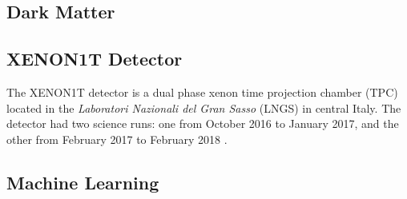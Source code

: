 \subsection{Dark Matter}
\subsection{XENON1T Detector}
The XENON1T detector is a dual phase xenon time projection chamber (TPC) located in the \textit{Laboratori Nazionali del Gran Sasso} (LNGS) in central Italy.
The detector had two science runs: one from October 2016 to January 2017, and the other from February 2017 to February 2018 \cite{1TDM_DataAnalysis}.
\subsection{Machine Learning}
